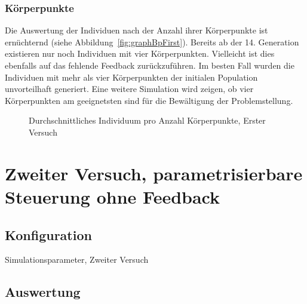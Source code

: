     \subsubsection{Körperpunkte\label{subsub:bp}}

      Die Auswertung der Individuen nach der Anzahl ihrer Körperpunkte ist ernüchternd (siehe Abbildung~\vref{fig:graphBpFirst}).
      Bereits ab der 14. Generation existieren nur noch Individuen mit vier Körperpunkten.
      Vielleicht ist dies ebenfalls auf das fehlende Feedback zurückzuführen.
      Im besten Fall wurden die Individuen mit mehr als vier Körperpunkten der initialen Population unvorteilhaft generiert.
      Eine weitere Simulation wird zeigen,
      ob vier Körperpunkten am geeignetsten sind für die Bewältigung der Problemstellung.

      \begin{figure}
        \centering
        
        \caption{Durchschnittliches Individuum pro Anzahl Körperpunkte, Erster Versuch\label{fig:graphBpFirst}}
      \end{figure}

  \section{Zweiter Versuch, parametrisierbare Steuerung ohne Feedback}

    \subsection{Konfiguration}

      \begin{table}[H]
        \centering
        
        \caption{Simulationsparameter, Zweiter Versuch}
      \end{table}

    \subsection{Auswertung}

